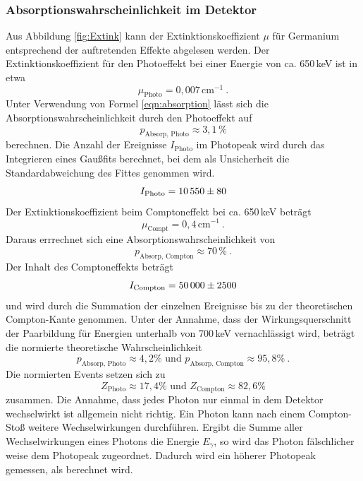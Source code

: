 \subsubsection{Absorptionswahrscheinlichkeit im Detektor}
Aus Abbildung \ref{fig:Extink} kann der Extinktionskoeffizient $\mu$ für Germanium entsprechend der auftretenden Effekte abgelesen werden. Der Extinktionskoeffizient für den Photoeffekt bei einer Energie von ca. 650\,keV ist in etwa
\begin{equation}
  \mu_\text{Photo} = 0,007 \, \text{cm} ^{-1} \ .
  \label{eqn:muPhoto}
\end{equation}
Unter Verwendung von Formel \ref{eqn:absorption} lässt sich die Absorptionswahrscheinlichkeit durch den Photoeffekt auf
\begin{equation}
  p_\text{Absorp, Photo} \approx 3,1 \, \%
  \label{eqn:AbsorpPhoto}
\end{equation}
berechnen. Die Anzahl der Ereignisse $I_\text{Photo}$ im Photopeak wird durch das Integrieren eines Gaußfits berechnet, bei dem als Unsicherheit die Standardabweichung des Fittes genommen wird.
\begin{equation}
  I_\text{Photo} = \num{10550 +- 80}
  \label{eqn:iPhoto}
\end{equation}
Der Extinktionskoeffizient beim Comptoneffekt bei ca. 650\,keV beträgt
\begin{equation}
  \mu_\text{Compt} = 0,4 \, \text{cm} ^{-1} \ .
  \label{eqn:muCompt}
\end{equation}
Daraus errrechnet sich eine Absorptionswahrscheinlichkeit von
\begin{equation}
  p_\text{Absorp, Compton} \approx 70 \, \% \ .
  \label{eqn:AbsorpComp}
\end{equation}
Der Inhalt des Comptoneffekts beträgt
\begin{equation}
  I_\text{Compton} = \num{50000 +- 2500} 
  \label{eqn:iComp}
\end{equation}
und wird durch die Summation der einzelnen Ereignisse bis zu der theoretischen Compton-Kante genommen. Unter der Annahme, dass der Wirkungsquerschnitt der Paarbildung für Energien unterhalb von 700\,keV vernachlässigt wird, beträgt die normierte theoretische Wahrscheinlichkeit
\begin{equation}
  p_\text{Absorp, Photo} \approx 4,2 \% \text{ und } p_\text{Absorp, Compton} \approx 95,8 \% \ .
  \label{eqn:pNorm}
\end{equation}
Die normierten Events setzen sich zu
\begin{equation}
  Z_\text{Photo} \approx 17,4 \% \text{ und } Z_\text{Compton} \approx 82,6 \%
  \label{eqn:expNorm}
\end{equation}
zusammen. Die Annahme, dass jedes Photon nur einmal in dem Detektor wechselwirkt ist allgemein nicht richtig. Ein Photon kann nach einem Compton-Stoß weitere Wechselwirkungen durchführen. Ergibt die Summe aller Wechselwirkungen eines Photons die Energie $E_\gamma$, so wird das Photon fälschlicher weise dem Photopeak zugeordnet. Dadurch wird ein höherer Photopeak gemessen, als berechnet wird.
